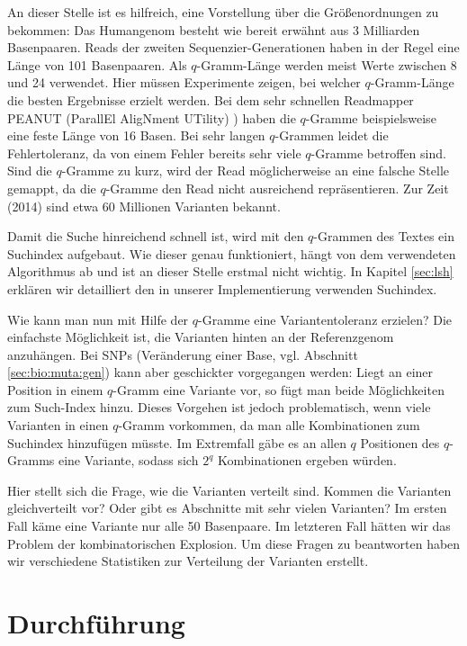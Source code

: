 An dieser Stelle ist es hilfreich, eine Vorstellung über die Größenordnungen zu bekommen: Das Humangenom besteht wie bereit erwähnt aus 3 Milliarden Basenpaaren. Reads der zweiten Sequenzier-Generationen haben in der Regel eine Länge von 101 Basenpaaren. Als $q$-Gramm-Länge werden meist Werte zwischen 8 und 24 verwendet. Hier müssen Experimente zeigen, bei welcher $q$-Gramm-Länge die besten Ergebnisse erzielt werden. Bei dem sehr schnellen Readmapper PEANUT (ParallEl AligNment UTility)
) \citep{Koester2014} haben die $q$-Gramme beispielsweise eine feste Länge von 16 Basen. Bei sehr langen $q$-Grammen leidet die Fehlertoleranz, da von einem Fehler bereits sehr viele $q$-Gramme betroffen sind. Sind die $q$-Gramme zu kurz, wird der Read möglicherweise an eine falsche Stelle gemappt, da die $q$-Gramme den Read nicht ausreichend repräsentieren. Zur Zeit (2014) sind etwa 60 Millionen Varianten bekannt.

Damit die Suche hinreichend schnell ist, wird mit den $q$-Grammen des Textes ein Suchindex aufgebaut. Wie dieser genau funktioniert, hängt von dem verwendeten Algorithmus ab und ist an dieser Stelle erstmal nicht wichtig. In Kapitel \ref{sec:lsh} erklären wir detailliert den in unserer Implementierung verwenden Suchindex. 

Wie kann man nun mit Hilfe der $q$-Gramme eine Variantentoleranz erzielen? Die einfachste Möglichkeit ist, die Varianten hinten an der Referenzgenom anzuhängen. Bei SNPs (Veränderung einer Base, vgl. Abschnitt \ref{sec:bio:muta:gen}) kann aber geschickter vorgegangen werden: Liegt an einer Position in einem $q$-Gramm eine Variante vor, so fügt man beide Möglichkeiten zum Such-Index hinzu. Dieses Vorgehen ist jedoch problematisch, wenn viele Varianten in einen $q$-Gramm vorkommen, da man alle Kombinationen zum Suchindex hinzufügen müsste. Im Extremfall gäbe es an allen $q$ Positionen des $q$-Gramms eine Variante, sodass sich $2^q$ Kombinationen ergeben würden. 

Hier stellt sich die Frage, wie die Varianten verteilt sind. Kommen die Varianten gleichverteilt vor? Oder gibt es Abschnitte mit sehr vielen Varianten? Im ersten Fall käme eine Variante nur alle 50 Basenpaare. Im letzteren Fall hätten wir das Problem der kombinatorischen Explosion. Um diese Fragen zu beantworten haben wir verschiedene Statistiken zur Verteilung der Varianten erstellt.

\section{Durchführung}
\label{sec:stats:durchfuhrung}

